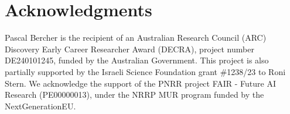 \documentclass[letterpaper]{article} %
\newcommand{\miniparagraph}[1]{\textbf{#1.}}
\newcommand{\commentout}[1]{ }
\newif\ifaddcomments
\newcommand{\brendan}[1]{\ifaddcomments{\textcolor{brown}{[Brendan: {#1}]}}\fi}
\begin{document}
\commentout{
\miniparagraph{Online learning of domain models}
Here, the learning algorithm is required to learn a domain model by actively interacting with the environment~\citep{lamanna2021online, sreedharan2023optimistic, benyamin2025integratingreinforcementlearningaction, ng2019incremental, chitnis2021glib, jin2022creativity, verma2023autonomous, karia2023epistemic}. 
All the proposed metrics can be computed as-is, after a predefined number of iterations, for the online learning setting. 
However, an additional perspective that may be of interest in online learning of domain models is \emph{cumulative} metrics of the learning process, such as the number of actions performed for learning or the number of problems failed to solve while collecting observations.
Specific metrics and evaluation for online learning of domain models, however, are beyond the scope of this work. 
}


\section{Acknowledgments}
Pascal Bercher is the recipient of an Australian Research Council (ARC) Discovery Early Career Researcher Award (DECRA), project number DE240101245, funded by the Australian Government. 
This project is also partially supported by the Israeli Science Foundation grant \#1238/23 to Roni Stern. 
%
We acknowledge the support  of the PNRR project FAIR -  
Future AI Research (PE00000013),  under the NRRP MUR 
program funded by the NextGenerationEU.


\end{document}

